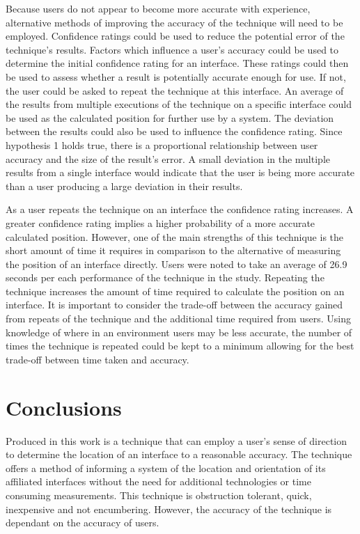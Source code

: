 \documentclass{bmcart}
\begin{document}
Because users do not appear to become more accurate with experience, alternative methods of improving the accuracy of the technique will need to be employed.
Confidence ratings could be used to reduce the potential error of the technique's results.
Factors which influence a user's accuracy could be used to determine the initial confidence rating for an interface.
These ratings could then be used to assess whether a result is potentially accurate enough for use.
If not, the user could be asked to repeat the technique at this interface.
An average of the results from multiple executions of the technique on a specific interface could be used as the calculated position for further use by a system.
The deviation between the results could also be used to influence the confidence rating.
Since hypothesis 1 holds true, there is a proportional relationship between user accuracy and the size of the result's error.
A small deviation in the multiple results from a single interface would indicate that the user is being more accurate than a user producing a large deviation in their results.

As a user repeats the technique on an interface the confidence rating increases.
A greater confidence rating implies a higher probability of a more accurate calculated position.
However, one of the main strengths of this technique is the short amount of time it requires in comparison to the alternative of measuring the position of an interface directly.
Users were noted to take an average of 26.9 seconds per each performance of the technique in the study.
Repeating the technique increases the amount of time required to calculate the position on an interface.
It is important to consider the trade-off between the accuracy gained from repeats of the technique and the additional time required from users.
Using knowledge of where in an environment users may be less accurate, the number of times the technique is repeated could be kept to a minimum allowing for the best trade-off between time taken and accuracy.


\section*{Conclusions}\label{sec:conclusion}


Produced in this work is a technique that can employ a user's sense of direction to determine the location of an interface to a reasonable accuracy.
The technique offers a method of informing a system of the location and orientation of its affiliated interfaces without the need for additional technologies or time consuming measurements. 
This technique is obstruction tolerant, quick, inexpensive and not encumbering.
However, the accuracy of the technique is dependant on the accuracy of users.
\end{document}
